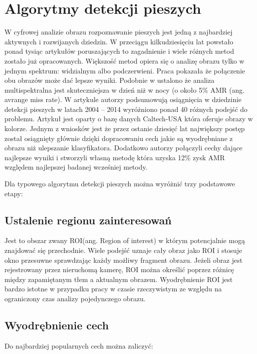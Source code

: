 \section{Algorytmy detekcji pieszych}

W cyfrowej analizie obrazu rozpoznawanie pieszych jest jedną z najbardziej aktywnych i rozwijanych dziedzin. W przeciągu kilkudziesięciu lat powstało ponad tysiąc artykułów poruszających to zagadnienie \cite{zhang2015filtered} i wiele różnych metod zostało już opracowanych. Większość metod opiera się o analizę obrazu tylko w jednym spektrum: widzialnym albo podczerwieni. Praca \cite{hwang2015multispectral} pokazała że połączenie obu obrazów może dać lepsze wyniki. Podobnie w \cite{gonzalez2016pedestrian} ustalono że analiza multispektralna jest skuteczniejsza w dzień niż w nocy (o około 5\% AMR (ang. avrange miss rate).   W artykule \cite{benenson2014ten} autorzy podsumowują osiągnięcia w dziedzinie detekcji pieszych w latach 2004 – 2014 wyróżniono ponad 40 różnych podejść do problemu. Artykuł jest oparty o bazę danych Caltech-USA która oferuje obrazy w kolorze. Jednym z wniosków jest że przez ostanie dziesięć lat największy postęp został osiągnięty głównie dzięki dopracowaniu cech jakie są wyodrębniane z obrazu niż ulepszanie klasyfikatora. Dodatkowo autorzy połączyli cechy dające najlepsze wyniki i stworzyli własną metodę która uzyska 12\% zysk AMR względem  najlepszej badanej wcześniej metody.

Dla typowego algorytmu detekcji pieszych można wyróżnić trzy podstawowe etapy:

\subsection{Ustalenie regionu zainteresowań} 
Jest to obszar zwany ROI(ang. Region of interest) w którym potencjalnie mogą znajdować się przechodnie. Wiele podejść uznaje cały obraz jako ROI i stosuje okno przesuwne sprawdzając każdy możliwy fragment obrazu. Jeżeli obraz jest rejestrowany przez nieruchomą kamerę, ROI można określić poprzez różnicę między zapamiętanym tłem a aktualnym obrazem. Wyodrębnienie ROI jest bardzo istotne w przypadku pracy w czasie rzeczywistym ze względu na ograniczony czas analizy pojedynczego obrazu.

\subsection{Wyodrębnienie cech}

Do najbardziej popularnych cech można zaliczyć:

